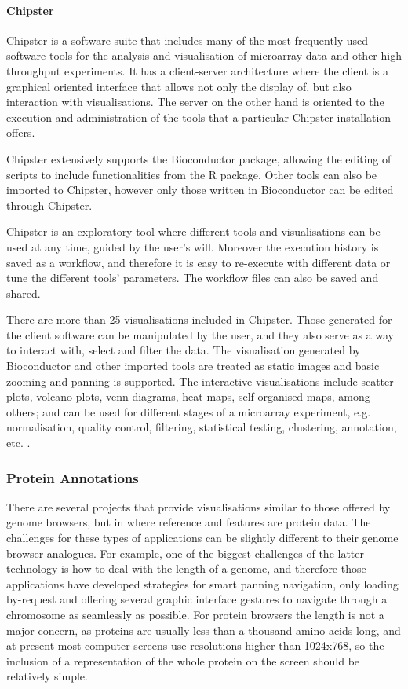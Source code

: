 \paragraph{Chipster}
Chipster is a software suite that includes many of the most frequently used software tools for the analysis and visualisation of microarray data and other high throughput experiments. It has a client-server architecture where the client is a graphical oriented interface that allows not only the display of, but also interaction with visualisations. The server on the other hand is oriented to the execution and administration of the tools that a particular Chipster installation offers.

Chipster extensively supports the Bioconductor package, allowing the editing of scripts to include functionalities from the R package. Other tools can also be imported to Chipster, however only those written in Bioconductor can be edited through Chipster.

Chipster is an exploratory tool where different tools and visualisations can be used at any time, guided by the user's will. Moreover the execution history is saved as a workflow, and therefore it is easy to re-execute with different data or tune the different tools' parameters. The workflow files can also be saved and shared.

There are more than 25 visualisations included in Chipster. Those generated for the client software can be manipulated by the user, and they also serve as a way to interact with, select and filter the data. The visualisation generated by Bioconductor and other imported tools are treated as static images and basic zooming and panning is supported. The interactive visualisations include scatter plots, volcano plots, venn diagrams, heat maps, self organised maps, among others; and can be used for different stages of a microarray experiment, e.g. normalisation, quality control, filtering, statistical testing, clustering, annotation, etc. \cite{KAL2011}. 


\subsubsection{Protein Annotations}
There are several projects that provide visualisations similar to those offered by genome browsers, but in where reference and features are protein data. The challenges for these types of applications can be slightly different to their genome browser analogues. For example, one of the biggest challenges of the latter technology is how to deal with the length of a genome, and therefore those applications have developed strategies for smart panning navigation, only loading by-request and offering several graphic interface gestures to navigate through a chromosome as seamlessly as possible. For protein browsers the length is not a major concern, as proteins are usually less than a thousand amino-acids long, and at present most computer screens use resolutions higher than 1024x768, so the inclusion of a representation of the whole protein on the screen should be relatively simple.

